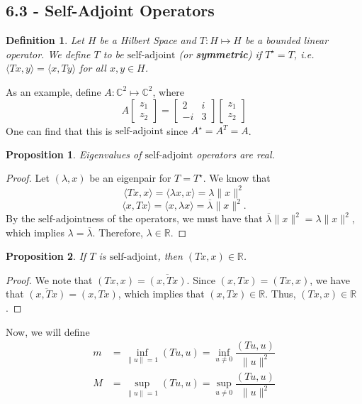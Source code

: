 \documentclass[12pt]{article}
\newtheorem{definition}{Definition}
\newtheorem{proposition}{Proposition}
\newcommand{\R}{{\mathbb R}}
\newcommand{\C}{{\mathbb C}}
\newcommand{\la}{\langle}
\newcommand{\ra}{\rangle}
\newcommand{\ov}{\overline}
\newcommand{\Ts}{T^{\star}}
\newcommand{\As}{A^{\star}}
\newcommand{\saj}{\text{self-adjoint}}
\begin{document}
\subsection*{6.3 - Self-Adjoint Operators}
\begin{definition}
Let $H$ be a Hilbert Space and $T: H \mapsto H$ be a bounded linear operator. We define $T$ to be \textbf{$\saj$} (or \textbf{symmetric}) if $\Ts = T$, i.e. $\la Tx, y \ra = \la x, Ty \ra$ for all $x, y \in H$.
\end{definition}
As an example, define $A: \C^2 \mapsto \C^2$, where 
\[ A \left[ \begin{matrix}
z_1 \\
z_2
\end{matrix} \right] = \left[ \begin{matrix}
2 & i \\
-i & 3 
\end{matrix}\right] \left[ \begin{matrix}
z_1 \\
z_2
\end{matrix}\right] \]
One can find that this is $\saj$ since $\As = \ov{A^T} = A$.
\begin{proposition}
Eigenvalues of $\saj$ operators are real. 
\end{proposition}
\vspace{-25pt}
\begin{proof}
Let $(\lambda, x)$ be an eigenpair for $T = \Ts$. We know that 
\[ \la Tx, x \ra = \la \lambda x, x \ra = \lambda \| x\|^2\]
\[ \la x, Tx \ra = \la x, \lambda x \ra = \ov{\lambda} \| x\|^2.\]
By the $\saj$ness of the operators, we must have that $\ov{\lambda} \| x\|^2 = \lambda \| x \|^2$, which implies $\lambda = \ov{\lambda}$. Therefore, $\lambda \in \R$. 
\end{proof}
\begin{proposition}
If $T$ is $\saj$, then $(Tx, x) \in \R$. 
\end{proposition}
\vspace{-25pt}
\begin{proof}
We note that $(Tx, x) = \ov{(x, Tx)}$. Since $(x, Tx) = (Tx, x)$, we have that $\ov{(x, Tx)} = (x, Tx)$, which implies that $(x, Tx) \in \R$. Thus, $(Tx, x) \in \R$. 
\end{proof}
Now, we will define 
\vspace{-5pt}
\begin{align*}
m & = \inf_{\| u \| = 1} (Tu, u)  = \inf_{u \neq 0} \dfrac{(Tu, u)}{\| u \|^2}\\
M & = \sup_{\| u \| = 1} (Tu, u)  = \sup_{u \neq 0} \dfrac{(Tu, u)}{\| u \|^2}
\end{align*}
\end{document}
